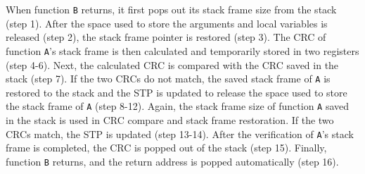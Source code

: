 When function \texttt{B} returns, it first pops out its stack frame size from the stack (step 1). After the space used to store the arguments and local variables is released (step 2), the stack frame pointer is restored (step 3). The CRC of function \texttt{A}'s stack frame is then calculated and temporarily stored in two registers (step 4-6). Next, the calculated CRC is compared with the CRC saved in the stack (step 7). If the two CRCs do not match, the saved stack frame of \texttt{A} is restored to the stack and the STP is updated to release the space used to store the stack frame of \texttt{A} (step 8-12). Again, the stack frame size of function \texttt{A} saved in the stack is used in CRC compare and stack frame restoration. If the two CRCs match, the STP is updated (step 13-14). After the verification of \texttt{A}'s stack frame is completed, the CRC is popped out of the stack (step 15). Finally, function \texttt{B} returns, and the return address is popped automatically (step 16).


